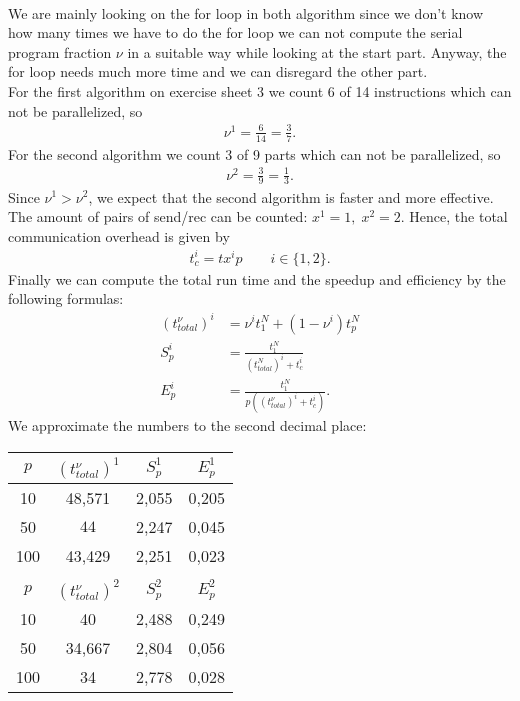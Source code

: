 \documentclass{article}
\begin{document}
\begin{enumerate}[label=(\alph*)]
\\
We are mainly looking on the for loop in both algorithm since we don't know how many times we have to do the for loop we can not compute the serial program fraction $\nu$ in a suitable way while looking at the start part. Anyway, the for loop needs much more time and we can disregard the other part.
\\
For the first algorithm on exercise sheet 3 we count 6 of 14 instructions which can not be parallelized, so 
\begin{align*}
    \nu^1=\frac{6}{14}=\frac{3}{7}.
\end{align*}
For the second algorithm we count 3 of 9 parts which can not be parallelized, so
\begin{align*}
    \nu^2=\frac{3}{9}=\frac{1}{3}.
\end{align*}
Since $\nu^1>\nu^2$, we expect that the second algorithm is faster and more effective.
\\
The amount of pairs of send/rec can be counted: $x^1=1,\;x^2=2$. Hence, the total communication overhead is given by
\begin{align*}
    t^i_c=tx^ip\qquad i\in\{1,2\}.
\end{align*}
Finally we can compute the total run time and the speedup and efficiency by the following formulas:
\begin{align*}
    (t_{total}^\nu)^i&= \nu^i t_1^N +(1-\nu^i)t_p^N\\
    S_p^i &= \frac{t_1^N}{(t_{total}^N)^i+t_c^i}\\
    E_p^i &= \frac{t_1^N}{p((t_{total}^\nu)^i+t_c^i)}.
\end{align*}
We approximate the numbers to the second decimal place:
    \begin{center}
\begin{tabular}{ c | c | c | c } 
  $p$ & $(t_{total}^\nu)^1$ & $S_p^1$ & $E_p^1$ \\
  \hline
  10    &    48,571             &   2,055  &   0,205\\
  50    &    $44$    &   2,247 &   0,045   \\
  100   &    43,429             &   2,251           &   0,023    \\
  \\
  $p$ & $(t_{total}^\nu)^2$ & $S_p^2$ & $E_p^2$ \\
  \hline
  10    &    40    &   2,488 &      0,249 \\
  50    &    34,667             &   2,804 &  0,056   \\
  100   &    34    &   2,778&       0,028    \\
\end{tabular}        
    \end{center}


\end{enumerate}
\end{document}
